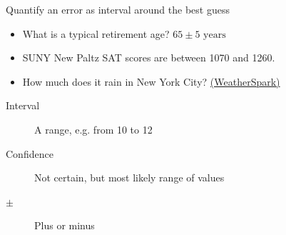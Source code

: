 \begin{frame}{Quantify an error as interval around the best guess}
   \begin{itemize}
    \item What is a typical retirement age? $65 \pm 5 \text{ years}$
    \item SUNY New Paltz SAT scores are between 1070 and 1260.
    \item How much does it rain in New York City? 
        \href{https://weatherspark.com/y/23912/Average-Weather-in-New-York-City-New-York-United-States-Year-Round\#Figures-Rainfall}{(WeatherSpark)}
   \end{itemize}
        \begin{description}
            \item[Interval] A range, e.g. from 10 to 12
            \item[Confidence] Not certain, but most likely range of values
            \item[$\pm$] Plus or minus
        \end{description}
    \end{frame}
    
